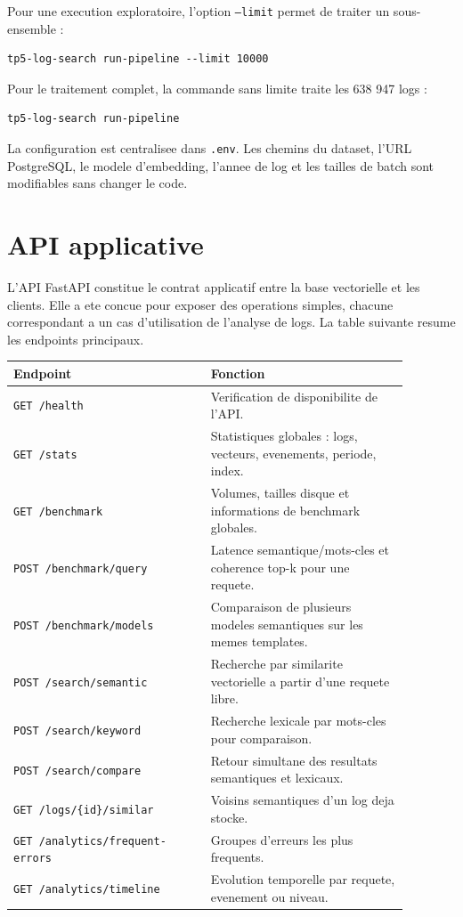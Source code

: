 \documentclass[12pt,a4paper]{article}
\begin{document}
Pour une execution exploratoire, l'option \texttt{--limit} permet de traiter un sous-ensemble :

\begin{lstlisting}
tp5-log-search run-pipeline --limit 10000
\end{lstlisting}

Pour le traitement complet, la commande sans limite traite les 638 947 logs :

\begin{lstlisting}
tp5-log-search run-pipeline
\end{lstlisting}

La configuration est centralisee dans \texttt{.env}. Les chemins du dataset, l'URL PostgreSQL, le
modele d'embedding, l'annee de log et les tailles de batch sont modifiables sans changer le code.

\section{API applicative}

L'API FastAPI constitue le contrat applicatif entre la base vectorielle et les clients. Elle a ete
concue pour exposer des operations simples, chacune correspondant a un cas d'utilisation de
l'analyse de logs. La table suivante resume les endpoints principaux.

\begin{longtable}{p{0.44\linewidth}p{0.44\linewidth}}
\toprule
Endpoint & Fonction\\
\midrule
\texttt{GET /health} & Verification de disponibilite de l'API.\\
\texttt{GET /stats} & Statistiques globales : logs, vecteurs, evenements, periode, index.\\
\texttt{GET /benchmark} & Volumes, tailles disque et informations de benchmark globales.\\
\texttt{POST /benchmark/query} & Latence semantique/mots-cles et coherence top-k pour une requete.\\
\texttt{POST /benchmark/models} & Comparaison de plusieurs modeles semantiques sur les memes templates.\\
\texttt{POST /search/semantic} & Recherche par similarite vectorielle a partir d'une requete libre.\\
\texttt{POST /search/keyword} & Recherche lexicale par mots-cles pour comparaison.\\
\texttt{POST /search/compare} & Retour simultane des resultats semantiques et lexicaux.\\
\texttt{GET /logs/\{id\}/similar} & Voisins semantiques d'un log deja stocke.\\
\texttt{GET /analytics/frequent-errors} & Groupes d'erreurs les plus frequents.\\
\texttt{GET /analytics/timeline} & Evolution temporelle par requete, evenement ou niveau.\\
\bottomrule
\end{longtable}
\end{document}
